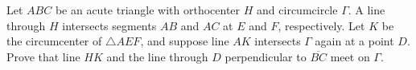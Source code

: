 Let $ABC$ be an acute triangle with orthocenter $H$ and circumcircle $\Gamma$. A line through $H$ intersects segments $AB$ and $AC$ at $E$ and $F$, respectively. Let $K$ be the circumcenter of $\triangle AEF$, and suppose line $AK$ intersects $\Gamma$ again at a point $D$. Prove that line $HK$ and the line through $D$ perpendicular to $\overline{BC}$ meet on $\Gamma$.